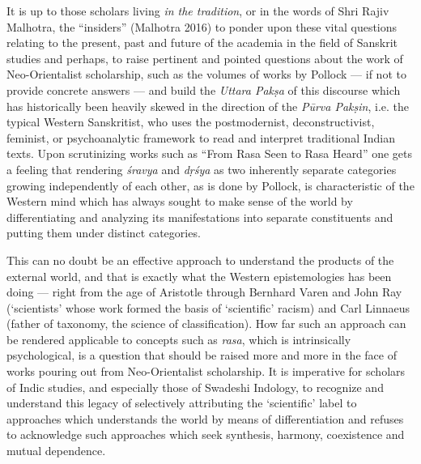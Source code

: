 It is up to those scholars living \textsl{in the tradition}, or in the words of Shri Rajiv Malhotra, the “insiders” (Malhotra 2016) to ponder upon these vital questions relating to the present, past and future of the academia in the field of Sanskrit studies and perhaps, to raise pertinent and pointed questions about the work of Neo-Orientalist scholarship, such as the volumes of works by Pollock --- if not to provide concrete answers --- and build the \textsl{Uttara Pakṣa} of this discourse which has historically been heavily skewed in the direction of the \textsl{Pūrva Pakṣin}, i.e. the typical Western Sanskritist, who uses the postmodernist, deconstructivist, feminist, or psychoanalytic framework to read and interpret traditional Indian texts. Upon scrutinizing works such as “From Rasa Seen to Rasa Heard” one gets a feeling that rendering \textsl{śravya} and \textsl{dṛśya} as two inherently separate categories growing independently of each other, as is done by Pollock, is characteristic of the Western mind which has always sought to make sense of the world by differentiating and analyzing its manifestations into separate constituents and putting them under distinct categories. 

This can no doubt be an effective approach to understand the products of the external world, and that is exactly what the Western epistemologies has been doing --- right from the age of Aristotle through Bernhard Varen and John Ray (‘scientists’ whose work formed the basis of ‘scientific’ racism) and Carl Linnaeus (father of taxonomy, the science of classification). How far such an approach can be rendered applicable to concepts such as \textsl{rasa}, which is intrinsically psychological, is a question that should be raised more and more in the face of works pouring out from Neo-Orientalist scholarship. It is imperative for scholars of Indic studies, and especially those of Swadeshi Indology, to recognize and understand this legacy of selectively attributing the ‘scientific’ label to approaches which understands the world by means of differentiation and refuses to acknowledge such approaches which seek synthesis, harmony, coexistence and mutual dependence.
 
